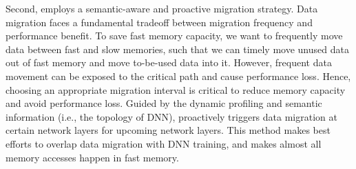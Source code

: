 

\textcolor{check}{Second, \name employs a semantic-aware and proactive migration strategy. Data migration faces a fundamental tradeoff between migration frequency and performance benefit. %
To save fast memory capacity, 
we want to frequently move data between fast and slow memories, such that we can timely move unused data out of fast memory and move to-be-used data into it. However, frequent data movement can be exposed to the critical path and cause performance loss. Hence, choosing an appropriate migration interval is critical to reduce memory capacity and avoid performance loss. Guided by the dynamic profiling and semantic information (i.e., the topology of DNN), \name %
proactively triggers data migration at certain network layers for upcoming network layers. This method makes best efforts to overlap data migration with DNN training, and makes almost all 
memory accesses happen in fast memory.} 



